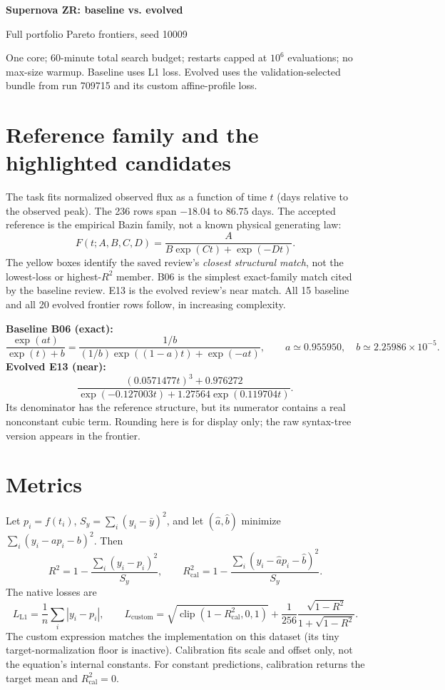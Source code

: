 \documentclass[10pt,letterpaper]{article}
\begin{document}
\thispagestyle{empty}
{\LARGE\bfseries\color{ink}Supernova ZR: baseline vs. evolved}\par
{\large Full portfolio Pareto frontiers, seed 10009}\par
One core; 60-minute total search budget; restarts capped at $10^6$ evaluations;
no max-size warmup. Baseline uses L1 loss. Evolved uses the validation-selected
bundle from run 709715 and its custom affine-profile loss.

\section*{Reference family and the highlighted candidates}
The task fits normalized observed flux as a function of time $t$ (days relative
to the observed peak). The 236 rows span $-18.04$ to $86.75$ days. The accepted
reference is the empirical Bazin family, not a known physical generating law:
\[
  F(t;A,B,C,D)=\frac{A}{B\exp(Ct)+\exp(-Dt)}.
\]
The yellow boxes identify the saved review's \emph{closest structural match},
not the lowest-loss or highest-$R^2$ member. B06 is the simplest exact-family
match cited by the baseline review. E13 is the evolved review's near match.
All 15 baseline and all 20 evolved frontier rows follow, in increasing complexity.

\textbf{Baseline B06 (exact):}
\[
 \frac{\exp(a t)}{\exp(t)+b}
 =\frac{1/b}{(1/b)\exp((1-a)t)+\exp(-a t)},\qquad
 a\simeq0.955950,\quad b\simeq2.25986\times10^{-5}.
\]
\textbf{Evolved E13 (near):}
\[
 \frac{(0.0571477t)^3+0.976272}
 {\exp(-0.127003t)+1.27564\exp(0.119704t)}.
\]
Its denominator has the reference structure, but its numerator contains a real
nonconstant cubic term. Rounding here is for display only; the raw syntax-tree
version appears in the frontier.

\section*{Metrics}
Let $p_i=f(t_i)$, $S_y=\sum_i(y_i-\bar y)^2$, and let
$(\hat a,\hat b)$ minimize $\sum_i(y_i-a p_i-b)^2$. Then
\[
 R^2=1-\frac{\sum_i(y_i-p_i)^2}{S_y},\qquad
 R^2_{\mathrm{cal}}=1-\frac{\sum_i(y_i-\hat a p_i-\hat b)^2}{S_y}.
\]
The native losses are
\[
 L_{\mathrm{L1}}=\frac1n\sum_i|y_i-p_i|,\qquad
 L_{\mathrm{custom}}=\sqrt{\operatorname{clip}(1-R^2_{\mathrm{cal}},0,1)}
 +\frac{1}{256}\frac{\sqrt{1-R^2}}{1+\sqrt{1-R^2}}.
\]
The custom expression matches the implementation on this dataset (its tiny
target-normalization floor is inactive). Calibration fits scale and offset only,
not the equation's internal constants. For constant predictions, calibration
returns the target mean and $R^2_{\mathrm{cal}}=0$.
\end{document}
